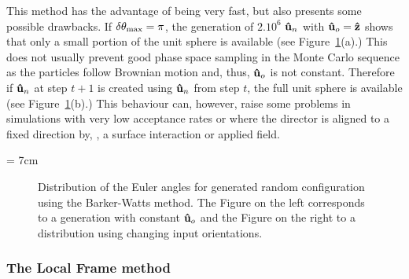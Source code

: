This method has the advantage of being very fast, but also presents some possible
drawbacks. If $\delta\theta_{\mathrm{max}} = \pi$, the generation of $2.10^6$ $\mathbf{\hat{u} }_n$ with
$\mathbf{\hat{u} }_o=\mathbf{\hat{z} }$ shows that only a small portion of the unit sphere is available (see
Figure~\ref{fig:BWdistro}(a).) This
does not usually prevent good phase space sampling in the Monte Carlo sequence as the particles
follow Brownian motion and, thus, $\mathbf{\hat{u} }_o$ is not constant. 
Therefore if $\mathbf{\hat{u} }_n$ at step $t+1$ is created using $\mathbf{\hat{u} }_n$ from step $t$, the full unit 
sphere is available (see Figure~\ref{fig:BWdistro}(b).) This behaviour can, however, raise some 
problems in simulations with  very low acceptance rates or where the director is aligned to a
fixed direction by, \eg, a surface interaction or applied field.

\picW = 7cm
\begin{figure}
	\centering
	\caption{Distribution of the Euler angles for generated random configuration using the
	Barker-Watts method. The Figure on the left corresponds to a generation with constant 
	$\mathbf{\hat{u} }_o$ and the Figure on the right to a distribution using changing input orientations.}
	\label{fig:BWdistro}
\end{figure}

\subsubsection{The Local Frame method}


